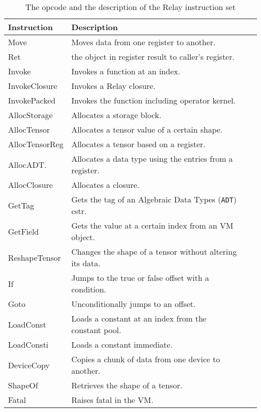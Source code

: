 \begin{table*}[h!]
    \begin{tabular}{@{}p{}p{}p{}p{}@{}}
    \toprule
    Instruction    & Description                                                  \\\midrule
    Move           & Moves data from one register to another.                     \\
    Ret            & the object in register result to caller's register.          \\
    Invoke         & Invokes a function at an index.                              \\
    InvokeClosure  & Invokes a Relay closure.                                     \\
    InvokePacked   & Invokes the function including operator kernel.              \\
    AllocStorage   & Allocates a storage block.                                   \\
    AllocTensor    & Allocates a tensor value of a certain shape.                 \\
    AllocTensorReg & Allocates a tensor based on a register.                      \\
    AllocADT.      & Allocates a data type using the entries from a register.     \\
    AllocClosure   & Allocates a closure.                                         \\
    GetTag         & Gets the tag of an Algebraic Data Types (\texttt{ADT}) cstr. \\
    GetField       & Gets the value at a certain index from an VM object.         \\
    ReshapeTensor  & Changes the shape of a tensor without altering its data.     \\
    If             & Jumps to the true or false offset with a condition.          \\
    Goto           & Unconditionally jumps to an offset.                          \\
    LoadConst      & Loads a constant at an index from the constant pool.         \\
    LoadConsti     & Loads a constant immediate.                                  \\
    DeviceCopy     & Copies a chunk of data from one device to another.           \\
    ShapeOf        & Retrieves the shape of a tensor.                             \\
    Fatal          & Raises fatal in the VM.                                      \\
    \bottomrule
    \end{tabular}
    \caption{The opcode and the description of the Relay instruction set \label{tab:isa}}
\end{table*}
